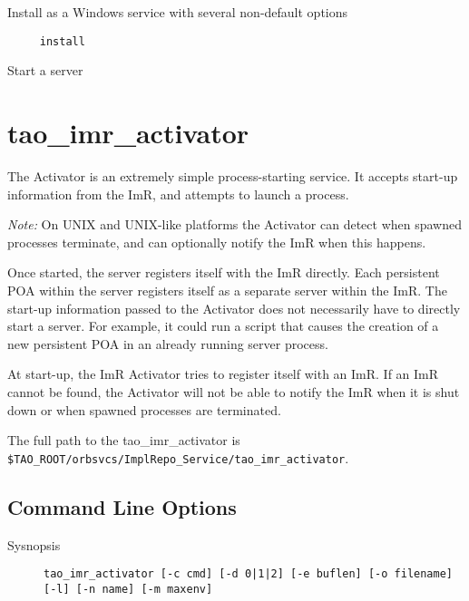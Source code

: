 Install as a Windows service with several non-default options


\begin{verbatim}
     install
\end{verbatim}

Start a server



\section{tao\_imr\_activator}
\label{taoimractivator}

The Activator is an extremely simple process-starting service. It accepts start-up information from the ImR,
and attempts to launch a process.

\emph {Note:} On UNIX and UNIX-like platforms the Activator can detect when spawned processes
terminate, and can optionally notify the ImR when this happens.

Once started, the server registers itself with the ImR directly. Each persistent POA within the server registers
itself as a separate server within the ImR.   The start-up information passed to the Activator does not necessarily
 have to directly start a server. For example, it could run a script that causes the creation of a new persistent
POA in an already running server process.

At start-up, the ImR Activator tries to register itself with an ImR. If an ImR cannot be found, the Activator
will not be able to notify the ImR when it is shut down or when spawned processes are terminated.

The full path to the tao\_imr\_activator is {\tt \$TAO\_ROOT/orbsvcs/ImplRepo\_Service/tao\_imr\_activator}.

\subsection{Command Line Options}

\begin{description}
\item[Sysnopsis] {\tt tao\_imr\_activator [-c cmd] [-d 0|1|2] [-e buflen] [-o filename] [-l] [-n name] [-m maxenv]}
\end{description}

